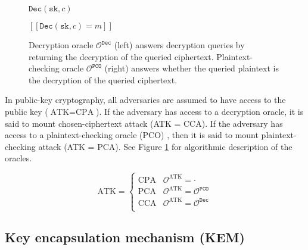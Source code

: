 \documentclass[runningheads]{llncs}
\newcommand{\decrypt}{\texttt{Dec}}
\newcommand{\sk}{\texttt{sk}}
\newcommand{\pco}{\texttt{PCO}}
\newcommand{\llbrack}{[\![}
\newcommand{\rrbrack}{]\!]}
\begin{document}
\begin{figure}[h]
    \centering
    \begin{minipage}[t]{0.4\textwidth}
        \begin{algorithm}[H]
            \caption*{$\mathcal{O}^\decrypt(c)$}
            \begin{algorithmic}[1]
                \State \Return $\decrypt(\sk, c)$
            \end{algorithmic}
        \end{algorithm}
    \end{minipage}\hfill
    \begin{minipage}[t]{0.4\textwidth}
        \begin{algorithm}[H]
            \caption*{$\mathcal{O}^\pco(m, c)$}
            \begin{algorithmic}[1]
                \State \Return $\llbrack \decrypt(\sk, c) = m \rrbrack$
            \end{algorithmic}
        \end{algorithm}
    \end{minipage}
    \caption{Decryption oracle $\mathcal{O}^\decrypt$ (left) answers decryption queries by returning the decryption of the queried ciphertext. Plaintext-checking oracle $\mathcal{O}^\pco$ (right) answers whether the queried plaintext is the decryption of the queried ciphertext.}\label{fig:pke-oracles}
\end{figure}

In public-key cryptography, all adversaries are assumed to have access to the public key ($\text{ATK} = \text{CPA}$). If the adversary has access to a decryption oracle, it is said to mount chosen-ciphertext attack (ATK = CCA). If the adversary has access to a plaintext-checking oracle (PCO) , then it is said to mount plaintext-checking attack (ATK = PCA). See Figure \ref{fig:pke-oracles} for algorithmic description of the oracles.

\begin{equation*}
    \text{ATK} = \begin{cases}
        \text{CPA} & \mathcal{O}^\text{ATK} = \cdot \\
        \text{PCA} & \mathcal{O}^\text{ATK} = \mathcal{O}^\pco \\
        \text{CCA} & \mathcal{O}^\text{ATK} = \mathcal{O}^\decrypt \\
    \end{cases}
\end{equation*}

\subsection{Key encapsulation mechanism (KEM)}\label{sec:key-encapsulation-mechanism}
\end{document}
